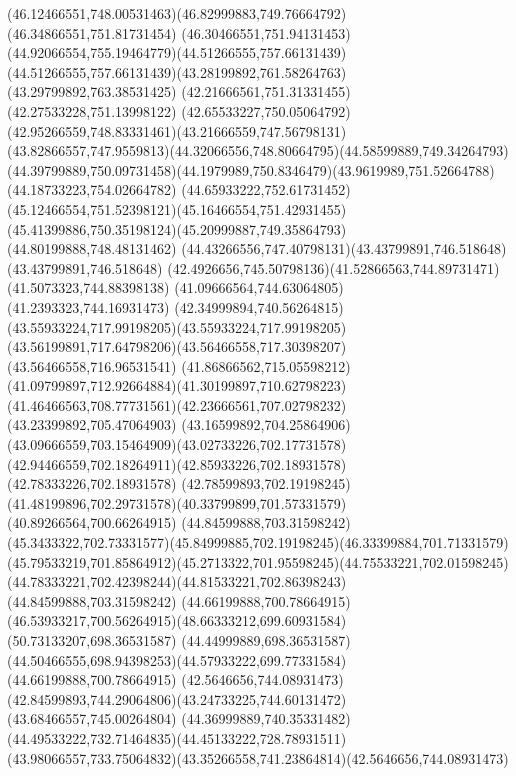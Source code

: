 {{		\curveto(46.12466551,748.00531463)(46.82999883,749.76664792)(46.34866551,751.81731454)
		\curveto(46.30466551,751.94131453)(44.92066554,755.19464779)(44.51266555,757.66131439)
		\curveto(44.51266555,757.66131439)(43.28199892,761.58264763)(43.29799892,763.38531425)
		\lineto(42.21666561,751.31331455)
		\lineto(42.27533228,751.13998122)
		\curveto(42.65533227,750.05064792)(42.95266559,748.83331461)(43.21666559,747.56798131)
		\curveto(43.82866557,747.9559813)(44.32066556,748.80664795)(44.58599889,749.34264793)
		\curveto(44.39799889,750.09731458)(44.1979989,750.8346479)(43.9619989,751.52664788)
		\lineto(44.18733223,754.02664782)
		\curveto(44.65933222,752.61731452)(45.12466554,751.52398121)(45.16466554,751.42931455)
		\curveto(45.41399886,750.35198124)(45.20999887,749.35864793)(44.80199888,748.48131462)
		\curveto(44.43266556,747.40798131)(43.43799891,746.518648)(43.43799891,746.518648)
		\curveto(42.4926656,745.50798136)(41.52866563,744.89731471)(41.5073323,744.88398138)
		\lineto(41.09666564,744.63064805)
		\lineto(41.2393323,744.16931473)
		\curveto(42.34999894,740.56264815)(43.55933224,717.99198205)(43.55933224,717.99198205)
		\curveto(43.56199891,717.64798206)(43.56466558,717.30398207)(43.56466558,716.96531541)
		\curveto(41.86866562,715.05598212)(41.09799897,712.92664884)(41.30199897,710.62798223)
		\curveto(41.46466563,708.77731561)(42.23666561,707.02798232)(43.23399892,705.47064903)
		\curveto(43.16599892,704.25864906)(43.09666559,703.15464909)(43.02733226,702.17731578)
		\curveto(42.94466559,702.18264911)(42.85933226,702.18931578)(42.78333226,702.18931578)
		\lineto(42.78599893,702.19198245)
		\curveto(41.48199896,702.29731578)(40.33799899,701.57331579)(40.89266564,700.66264915)
		\moveto(44.84599888,703.31598242)
		\curveto(45.3433322,702.73331577)(45.84999885,702.19198245)(46.33399884,701.71331579)
		\curveto(45.79533219,701.85864912)(45.2713322,701.95598245)(44.75533221,702.01598245)
		\curveto(44.78333221,702.42398244)(44.81533221,702.86398243)(44.84599888,703.31598242)
		\moveto(44.66199888,700.78664915)
		\curveto(46.53933217,700.56264915)(48.66333212,699.60931584)(50.73133207,698.36531587)
		\lineto(44.44999889,698.36531587)
		\curveto(44.50466555,698.94398253)(44.57933222,699.77331584)(44.66199888,700.78664915)
		\moveto(42.5646656,744.08931473)
		\curveto(42.84599893,744.29064806)(43.24733225,744.60131472)(43.68466557,745.00264804)
		\curveto(44.36999889,740.35331482)(44.49533222,732.71464835)(44.45133222,728.78931511)
		\curveto(43.98066557,733.75064832)(43.35266558,741.23864814)(42.5646656,744.08931473)
	}
}
